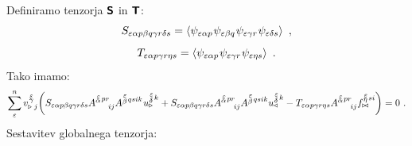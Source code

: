 Definiramo tenzorja $\bm{\mathsf{S}}$ in $\bm{\mathsf{T}}$:
\begin{equation}
   S_{\varepsilon   \alpha p   \beta q   \gamma r   \delta s}
   =
   \expval{
      \psi_{ \varepsilon   \alpha p} \mkern1mu
      \psi_{ \varepsilon   \beta q} \mkern1mu
      \psi_{ \varepsilon   \gamma r} \mkern1mu
      \psi_{ \varepsilon   \delta s} } \ ,
\end{equation}
\begin{equation}
   T_{\varepsilon   \alpha p   \gamma r   \eta s}
   =
   \expval{
      \psi_{\varepsilon \alpha p} \mkern1mu
      \psi_{\varepsilon \gamma r} \mkern1mu
      \psi_{ \varepsilon \eta s} } \ .
\end{equation}
Tako imamo:
\begin{equation}
   \sum^n_\varepsilon v^{\mkern 2mu \substack{\varepsilon \\[-0.65mm] \gamma \\[-0.2mm]}}_{\triangleright \mkern5mu j}
   \qty( S_{\varepsilon   \alpha p   \beta q   \gamma r   \delta s}
   A^{\substack{\mkern2mu \varepsilon \\[-0.65mm] \alpha} \mkern2mu p r}_{\mkern29mu i j}
   A^{\substack{\mkern2mu \varepsilon \\[0.05mm] \beta} \mkern2mu q s i k} \mkern1mu
   u^{\substack{\mkern2mu \varepsilon \\[0.09mm] \delta} \mkern2mu k}_\triangleright
   +
   S_{\varepsilon   \alpha p   \beta q   \gamma r   \delta s}
   A^{\substack{\mkern2mu \varepsilon \\[-0.65mm] \alpha} \mkern2mu p r}_{\mkern29mu i j}
   A^{\substack{\mkern2mu \varepsilon \\[0.05mm] \beta} \mkern2mu q s i k}
   u^{\substack{\mkern2mu \varepsilon \\[0.09mm] \delta} \mkern2mu k}_\triangleleft
   -
   T_{\varepsilon   \alpha p   \gamma r   \eta s}
   A^{\substack{\mkern2mu \varepsilon \\[-0.65mm] \alpha} \mkern2mu p r}_{\mkern29mu i j}
   f^{\substack{\mkern2mu \varepsilon \\[-0.59mm] \eta} \mkern2mu s i}_{\bowtie}
   ) = 0 \ .
\end{equation}
Sestavitev globalnega tenzorja:
